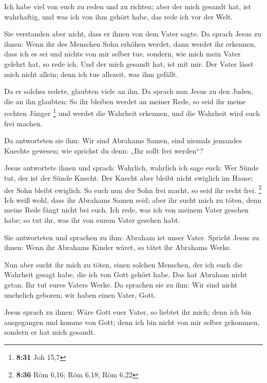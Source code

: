 Ich habe viel von euch zu reden und zu richten; aber der
mich gesandt hat, ist wahrhaftig, und was ich von ihm gehört habe, das
rede ich vor der Welt.

 Sie verstanden aber nicht, dass er ihnen von dem Vater
sagte.  Da sprach Jesus zu ihnen: Wenn ihr des Menschen
Sohn erhöhen werdet, dann werdet ihr erkennen, dass ich es sei und
nichts von mir selber tue, sondern, wie mich mein Vater gelehrt hat, so
rede ich.  Und der mich gesandt hat, ist mit mir. Der
Vater lässt mich nicht allein; denn ich tue allezeit, was ihm gefällt.

 Da er solches redete, glaubten viele an ihn.
 Da sprach nun Jesus zu den Juden, die an ihn glaubten:
So ihr bleiben werdet an meiner Rede, so seid ihr meine rechten Jünger
\footnote{\textbf{8:31} Joh 15,7}  und werdet die
Wahrheit erkennen, und die Wahrheit wird euch frei machen.

 Da antworteten sie ihm: Wir sind Abrahams Samen, sind
niemals jemandes Knechte gewesen; wie sprichst du denn: „Ihr sollt frei
werden``?

 Jesus antwortete ihnen und sprach: Wahrlich, wahrlich
ich sage euch: Wer Sünde tut, der ist der Sünde Knecht. 
Der Knecht aber bleibt nicht ewiglich im Hause; der Sohn bleibt
ewiglich.  So euch nun der Sohn frei macht, so seid ihr
recht frei. \footnote{\textbf{8:36} Röm 6,16; Röm 6,18; Röm 6,22}
 Ich weiß wohl, dass ihr Abrahams Samen seid; aber ihr
sucht mich zu töten, denn meine Rede fängt nicht bei euch.
 Ich rede, was ich von meinem Vater gesehen habe; so tut
ihr, was ihr von eurem Vater gesehen habt.

 Sie antworteten und sprachen zu ihm: Abraham ist unser
Vater. Spricht Jesus zu ihnen: Wenn ihr Abrahams Kinder wäret, so tätet
ihr Abrahams Werke.

 Nun aber sucht ihr mich zu töten, einen solchen
Menschen, der ich euch die Wahrheit gesagt habe, die ich von Gott gehört
habe. Das hat Abraham nicht getan.  Ihr tut eures Vaters
Werke. Da sprachen sie zu ihm: Wir sind nicht unehelich geboren; wir
haben einen Vater, Gott.

 Jesus sprach zu ihnen: Wäre Gott euer Vater, so liebtet
ihr mich; denn ich bin ausgegangen und komme von Gott; denn ich bin
nicht von mir selber gekommen, sondern er hat mich gesandt.

